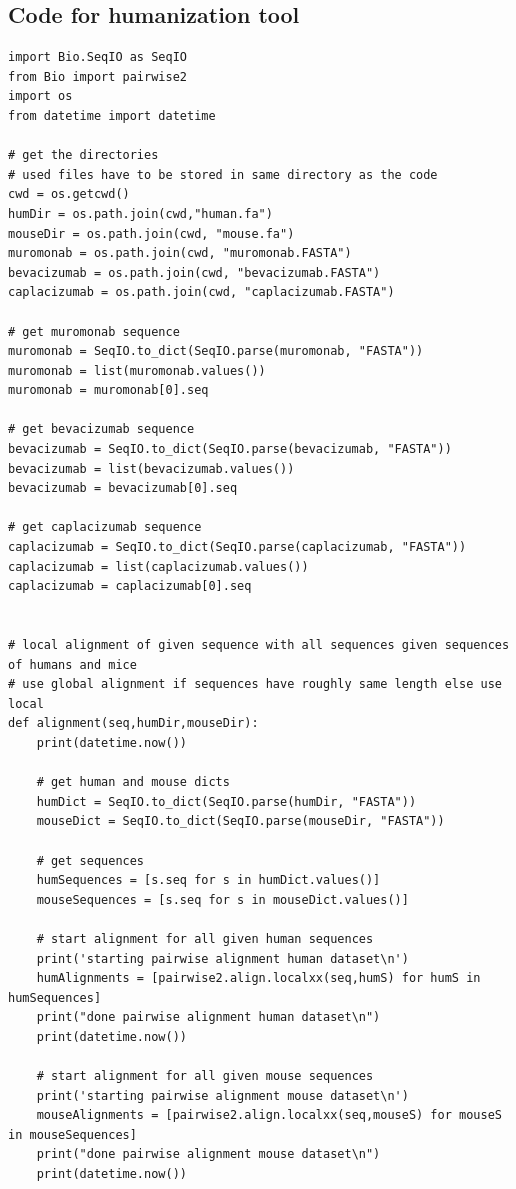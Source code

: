 \documentclass[11pt]{article}
\begin{document}
\subsection{Code for humanization tool}\label{appendix:code}

\begin{verbatim}
import Bio.SeqIO as SeqIO
from Bio import pairwise2
import os
from datetime import datetime

# get the directories
# used files have to be stored in same directory as the code
cwd = os.getcwd()
humDir = os.path.join(cwd,"human.fa")
mouseDir = os.path.join(cwd, "mouse.fa")
muromonab = os.path.join(cwd, "muromonab.FASTA")
bevacizumab = os.path.join(cwd, "bevacizumab.FASTA")
caplacizumab = os.path.join(cwd, "caplacizumab.FASTA")

# get muromonab sequence
muromonab = SeqIO.to_dict(SeqIO.parse(muromonab, "FASTA"))
muromonab = list(muromonab.values())
muromonab = muromonab[0].seq

# get bevacizumab sequence
bevacizumab = SeqIO.to_dict(SeqIO.parse(bevacizumab, "FASTA"))
bevacizumab = list(bevacizumab.values())
bevacizumab = bevacizumab[0].seq

# get caplacizumab sequence
caplacizumab = SeqIO.to_dict(SeqIO.parse(caplacizumab, "FASTA"))
caplacizumab = list(caplacizumab.values())
caplacizumab = caplacizumab[0].seq


# local alignment of given sequence with all sequences given sequences of humans and mice
# use global alignment if sequences have roughly same length else use local
def alignment(seq,humDir,mouseDir):
    print(datetime.now())
    
    # get human and mouse dicts
    humDict = SeqIO.to_dict(SeqIO.parse(humDir, "FASTA"))
    mouseDict = SeqIO.to_dict(SeqIO.parse(mouseDir, "FASTA")) 
    
    # get sequences
    humSequences = [s.seq for s in humDict.values()]
    mouseSequences = [s.seq for s in mouseDict.values()]
    
    # start alignment for all given human sequences
    print('starting pairwise alignment human dataset\n')    
    humAlignments = [pairwise2.align.localxx(seq,humS) for humS in humSequences]
    print("done pairwise alignment human dataset\n")  
    print(datetime.now())
    
    # start alignment for all given mouse sequences
    print('starting pairwise alignment mouse dataset\n')
    mouseAlignments = [pairwise2.align.localxx(seq,mouseS) for mouseS in mouseSequences]
    print("done pairwise alignment mouse dataset\n")    
    print(datetime.now())
         

\end{verbatim}
\end{document}

